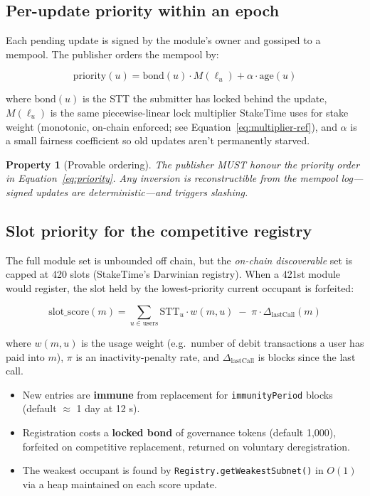 \documentclass[11pt,a4paper]{article}
\newtheorem{property}{Property}[section]
\begin{document}
\subsection{Per-update priority within an epoch}

Each pending update is signed by the module's owner and gossiped to a mempool. The publisher orders the mempool by:

\begin{equation}
\mathrm{priority}(u) = \mathrm{bond}(u) \cdot M(\ell_u) + \alpha \cdot \mathrm{age}(u)
\label{eq:priority}
\end{equation}

where $\mathrm{bond}(u)$ is the STT the submitter has locked behind the update, $M(\ell_u)$ is the same piecewise-linear lock multiplier StakeTime uses for stake weight (monotonic, on-chain enforced; see Equation~\ref{eq:multiplier-ref}), and $\alpha$ is a small fairness coefficient so old updates aren't permanently starved.

\begin{property}[Provable ordering]
The publisher MUST honour the priority order in Equation~\ref{eq:priority}. Any inversion is reconstructible from the mempool log---signed updates are deterministic---and triggers slashing.
\end{property}

\subsection{Slot priority for the competitive registry}

The full module set is unbounded off chain, but the \emph{on-chain discoverable} set is capped at 420 slots (StakeTime's Darwinian registry). When a 421st module would register, the slot held by the lowest-priority current occupant is forfeited:

\begin{equation}
\mathrm{slot\_score}(m) = \sum_{u \in \mathrm{users}} \mathrm{STT}_u \cdot w(m, u) \;-\; \pi \cdot \Delta_{\text{lastCall}}(m)
\label{eq:slot-score}
\end{equation}

where $w(m, u)$ is the usage weight (e.g.\ number of debit transactions a user has paid into $m$), $\pi$ is an inactivity-penalty rate, and $\Delta_{\text{lastCall}}$ is blocks since the last call.

\begin{itemize}
    \item New entries are \textbf{immune} from replacement for \texttt{immunityPeriod} blocks (default $\approx$ 1 day at 12 s).
    \item Registration costs a \textbf{locked bond} of governance tokens (default 1{,}000), forfeited on competitive replacement, returned on voluntary deregistration.
    \item The weakest occupant is found by \texttt{Registry.getWeakestSubnet()} in $O(1)$ via a heap maintained on each score update.
\end{itemize}
\end{document}
